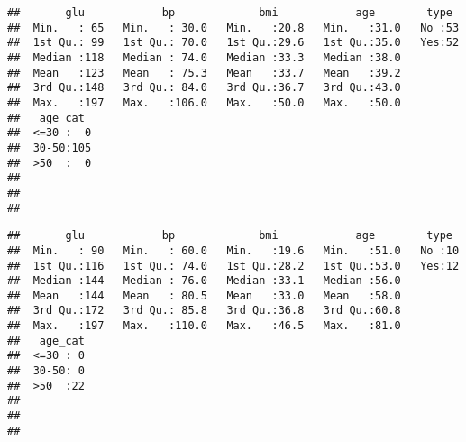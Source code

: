 \documentclass[]{book}
\newenvironment{Shaded}{\begin{snugshade}}{\end{snugshade}}
\newcommand{\KeywordTok}[1]{\textcolor[rgb]{0.13,0.29,0.53}{\textbf{#1}}}
\newcommand{\DecValTok}[1]{\textcolor[rgb]{0.00,0.00,0.81}{#1}}
\newcommand{\CommentTok}[1]{\textcolor[rgb]{0.56,0.35,0.01}{\textit{#1}}}
\newcommand{\OperatorTok}[1]{\textcolor[rgb]{0.81,0.36,0.00}{\textbf{#1}}}
\newcommand{\NormalTok}[1]{#1}
\theoremstyle{definition}
\theoremstyle{definition}
\theoremstyle{definition}
\theoremstyle{remark}
\begin{document}
\begin{verbatim}
##       glu            bp             bmi            age        type   
##  Min.   : 65   Min.   : 30.0   Min.   :20.8   Min.   :31.0   No :53  
##  1st Qu.: 99   1st Qu.: 70.0   1st Qu.:29.6   1st Qu.:35.0   Yes:52  
##  Median :118   Median : 74.0   Median :33.3   Median :38.0           
##  Mean   :123   Mean   : 75.3   Mean   :33.7   Mean   :39.2           
##  3rd Qu.:148   3rd Qu.: 84.0   3rd Qu.:36.7   3rd Qu.:43.0           
##  Max.   :197   Max.   :106.0   Max.   :50.0   Max.   :50.0           
##   age_cat   
##  <=30 :  0  
##  30-50:105  
##  >50  :  0  
##             
##             
## 
\end{verbatim}

\begin{Shaded}
\end{Shaded}

\begin{verbatim}
##       glu            bp             bmi            age        type   
##  Min.   : 90   Min.   : 60.0   Min.   :19.6   Min.   :51.0   No :10  
##  1st Qu.:116   1st Qu.: 74.0   1st Qu.:28.2   1st Qu.:53.0   Yes:12  
##  Median :144   Median : 76.0   Median :33.1   Median :56.0           
##  Mean   :144   Mean   : 80.5   Mean   :33.0   Mean   :58.0           
##  3rd Qu.:172   3rd Qu.: 85.8   3rd Qu.:36.8   3rd Qu.:60.8           
##  Max.   :197   Max.   :110.0   Max.   :46.5   Max.   :81.0           
##   age_cat  
##  <=30 : 0  
##  30-50: 0  
##  >50  :22  
##            
##            
## 
\end{verbatim}

\begin{Shaded}
\end{Shaded}
\end{document}
